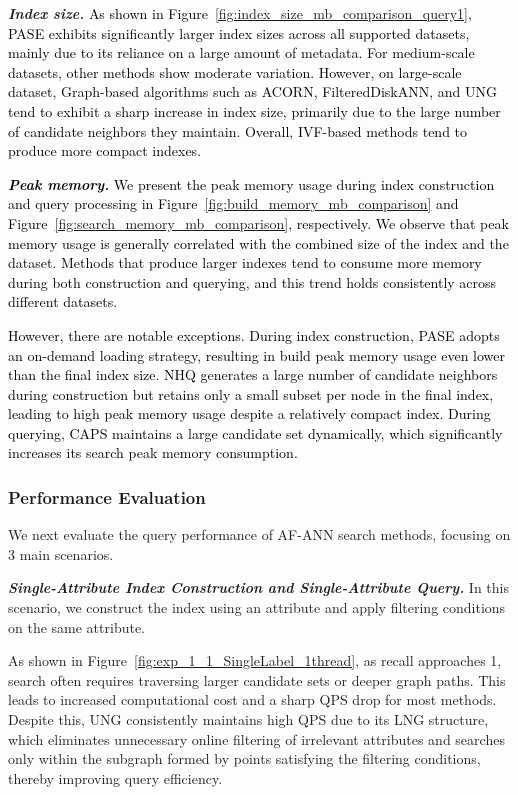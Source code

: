 \documentclass[sigconf, nonacm, pdfa]{acmart}
\begin{document}
{\textit{\textbf{Index size.}}
\textcolor{black}{
	As shown in Figure~\ref{fig:index_size_mb_comparison_query1}, PASE exhibits significantly larger index sizes across all supported datasets, mainly due to its reliance on a large amount of metadata. For medium-scale datasets, other methods show moderate variation. However, on large-scale dataset, Graph-based algorithms such as ACORN, FilteredDiskANN, and UNG tend to exhibit a sharp increase in index size, primarily due to the large number of candidate neighbors they maintain. Overall, IVF-based methods tend to produce more compact indexes.
}


\textcolor{black}{\textit{\textbf{Peak memory.}}	
We present the peak memory usage during index construction and query processing in Figure~\ref{fig:build_memory_mb_comparison} and Figure~\ref{fig:search_memory_mb_comparison}, respectively. We observe that peak memory usage is generally correlated with the combined size of the index and the dataset. Methods that produce larger indexes tend to consume more memory during both construction and querying, and this trend holds consistently across different datasets.}

\textcolor{black}{However, there are notable exceptions. During index construction, PASE adopts an on-demand loading strategy, resulting in build peak memory usage even lower than the final index size. NHQ generates a large number of candidate neighbors during construction but retains only a small subset per node in the final index, leading to high peak memory usage despite a relatively compact index.
During querying, CAPS maintains a large candidate set dynamically, which significantly increases its search peak memory consumption.}


 
	\subsubsection{Performance Evaluation}
	
	
	
	
	We next evaluate the query performance of AF-ANN search methods, focusing on 3 main scenarios.
	
	\textit{\textbf{Single-Attribute Index Construction and Single-Attribute Query.}}
	In this scenario, we construct the index using an attribute and apply filtering conditions on the same attribute.
	
	
	
	As shown in Figure~\ref{fig:exp_1_1_SingleLabel_1thread}, as recall approaches 1, search often requires traversing larger candidate sets or deeper graph paths. This leads to increased computational cost and a sharp QPS drop for most methods. Despite this, UNG consistently maintains high QPS due to its LNG structure, which eliminates unnecessary online filtering of irrelevant attributes and searches only within the subgraph formed by points satisfying the filtering conditions, thereby improving query efficiency.
	
}
\end{document}
